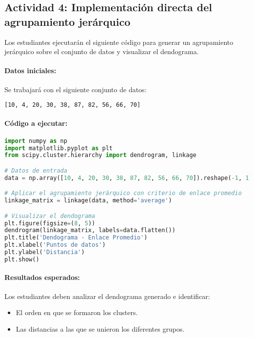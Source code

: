 \documentclass[a4,11pt]{aleph-notas}
\begin{document}
\subsection*{Actividad 4: Implementación directa del agrupamiento jerárquico}

Los estudiantes ejecutarán el siguiente código para generar un agrupamiento jerárquico sobre el conjunto de datos y visualizar el dendograma.

\paragraph{Datos iniciales:}  
Se trabajará con el siguiente conjunto de datos:
\begin{verbatim}
[10, 4, 20, 30, 38, 87, 82, 56, 66, 70]
\end{verbatim}

\paragraph{Código a ejecutar:}  \hspace{0pt}

\begin{pycodigo}
\begin{lstlisting}[language=Python]
import numpy as np
import matplotlib.pyplot as plt
from scipy.cluster.hierarchy import dendrogram, linkage

# Datos de entrada
data = np.array([10, 4, 20, 30, 38, 87, 82, 56, 66, 70]).reshape(-1, 1)

# Aplicar el agrupamiento jerárquico con criterio de enlace promedio
linkage_matrix = linkage(data, method='average')

# Visualizar el dendograma
plt.figure(figsize=(8, 5))
dendrogram(linkage_matrix, labels=data.flatten())
plt.title('Dendograma - Enlace Promedio')
plt.xlabel('Puntos de datos')
plt.ylabel('Distancia')
plt.show()
\end{lstlisting}
\end{pycodigo}

\paragraph{Resultados esperados:}  
Los estudiantes deben analizar el dendograma generado e identificar:
\begin{itemize}[leftmargin=*]
    \item El orden en que se formaron los clusters.
    \item Las distancias a las que se unieron los diferentes grupos.
\end{itemize}
\end{document}
